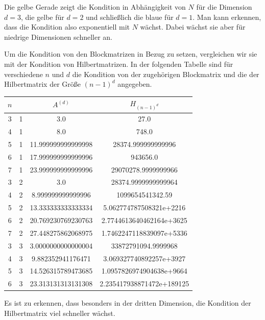 \documentclass[smallheadings]{scrartcl}
\theoremstyle{definition}
\begin{document}
Die gelbe Gerade zeigt die Kondition in Abhängigkeit von $N$ für die Dimension $d=3$, die gelbe für $d=2$ und schließlich die blaue für $d=1$. Man kann erkennen, dass die Kondition also exponentiell mit $N$ wächst. Dabei wächst sie aber für niedrige Dimensionen schneller an.

Um die Kondition von den Blockmatrizen in Bezug zu setzen, vergleichen wir sie mit der Kondition von Hilbertmatrizen. In der folgenden Tabelle sind für verschiedene $n$ und $d$ die Kondition von der zugehörigen Blockmatrix und die der Hilbertmatrix der Größe $(n-1)^d$ angegeben. 


\begin{minipage}{\textwidth}
\centering

		\begin{tabular}{c|c|c|c}
			$n$ & \text{Dimension} & \text{Kondition von} $A^{(d)}$ & \text{Kondition von} $H_{(n-1)^d}$\\
			\hline		
			\hline	
			3 & 1 & 3.0 & 27.0\\
			\hline
			4 & 1 & 8.0& 748.0 \\
			\hline
			5 & 1 & 11.999999999999998& 28374.999999999996\\
			\hline
			6 & 1 & 17.999999999999996& 943656.0\\
			\hline
			7 & 1 & 23.999999999999996 &29070278.9999999966 \\
			\hline
			3 & 2 & 3.0 &28374.9999999999964\\
			\hline
			4& 2 & 8.999999999999996 & 1099654541342.59 \\
			\hline
			5 & 2 & 13.333333333333334 & 5.062774787508321e+2216 \\
			\hline
			6&2 & 20.769230769230763 & 2.7744613640462164e+3625 \\
			\hline
			7 & 2 & 27.448275862068975 & 1.7462247118839097e+5336\\
			\hline
			3& 3& 3.0000000000000004& 33872791094.9999968 \\
			\hline
			4 & 3& 9.882352941176471 & 3.069327740892257e+3927\\
			\hline
			5 &3& 14.526315789473685&1.0957826974904638e+9664\\
			\hline
			6 &3& 23.313131313131308 & 2.235417938871472e+189125 \\
			\hline
		
		\end{tabular}
		\label{Tabelle}
	\end{minipage}
	Es ist zu erkennen, dass besonders in der dritten Dimension, die Kondition der Hilbertmatrix viel schneller wächst.
\end{document}
